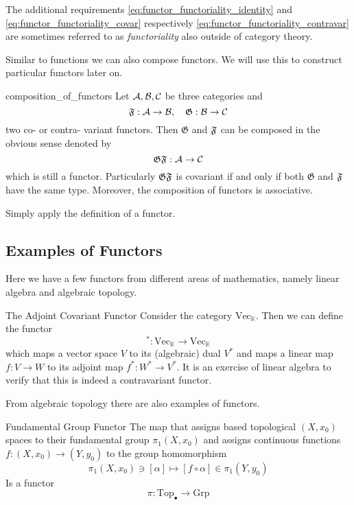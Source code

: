 The additional requirements \eqref{eq:functor_functoriality_identity} and \eqref{eq:functor_functoriality_covar} respectively \eqref{eq:functor_functoriality_contravar} are sometimes referred to as \emph{functoriality} also outside of category theory.

Similar to functions we can also compose functors. We will use this to construct particular functors later on.

\begin{defprop}{\cite[Section~1.3.1]{Roman2017}}{composition_of_functors}
Let $\mathcal{A}, \mathcal{B}, \mathcal{C}$ be three categories and
$$
\mathfrak{F}: \mathcal{A} \to \mathcal{B}, \quad \mathfrak{G}: \mathcal{B} \to \mathcal{C}
$$
two co- or contra- variant functors. Then $\mathfrak{G}$ and $\mathfrak{F}$ can be composed in the obvious sense denoted by
$$\mathfrak{G} \mathfrak{F}: \mathcal{A} \to \mathcal{C}$$
which is still a functor. Particularly $\mathfrak{G} \mathfrak{F}$ is covariant if and only if both $\mathfrak{G}$ and $\mathfrak{F}$ have the same type. Moreover, the composition of functors is associative.
\end{defprop}
\begin{proofidea}
Simply apply the definition of a functor.
\end{proofidea}

\subsection{Examples of Functors}

Here we have a few functors from different areas of mathematics, namely linear algebra and algebraic topology.

\begin{example}{The Adjoint Covariant Functor}{}
Consider the category $\mathrm{Vec}_\mathbb{K}$. Then we can define the functor
$$
^* : \mathrm{Vec}_\mathbb{K} \to \mathrm{Vec}_\mathbb{K}
$$
which maps a vector space $V$ to its (algebraic) dual $V^*$ and maps a linear map $f: V \to W$ to its adjoint map $f^*: W^* \to V^*$. It is an exercise of linear algebra to verify that this is indeed a contravariant functor.
\end{example}

From algebraic topology there are also examples of functors.
\begin{example}{Fundamental Group Functor}{}
\cite{Hatcher2001}
The map that assigns based topological $(X,x_0)$ spaces to their fundamental group $\pi_1(X,x_0)$ and assigns continuous functions $f: (X,x_0) \to (Y,y_0)$ to the group homomorphism 
$$
\pi_1(X,x_0) \ni [\alpha] \mapsto [f \circ \alpha] \in \pi_1(Y,y_0)
$$
Is a functor
$$
\pi: \mathrm{Top}_\bullet \to \mathrm{Grp}
$$
\end{example}

